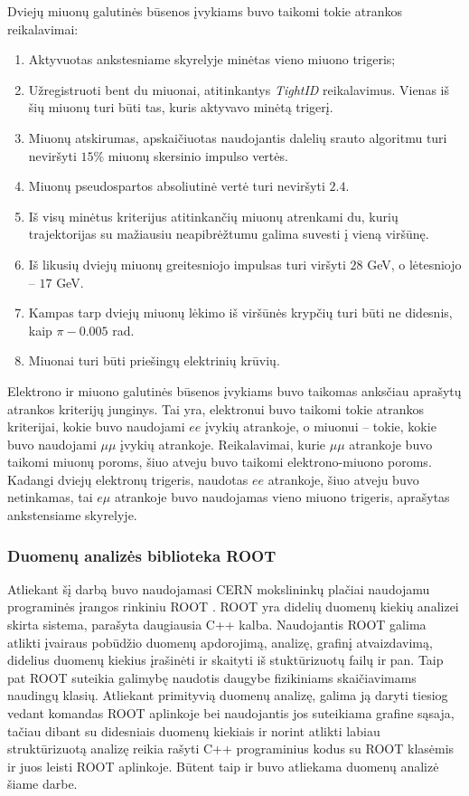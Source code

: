 \documentclass[a4paper, 12pt]{article}
\newcommand{\emu}{e\mu}
\newcommand{\mumu}{\mu\mu}
\begin{document}
Dviejų miuonų galutinės būsenos įvykiams buvo taikomi tokie atrankos reikalavimai:
\begin{enumerate}
	\item Aktyvuotas ankstesniame skyrelyje minėtas vieno miuono trigeris;
	\item Užregistruoti bent du miuonai, atitinkantys \textit{TightID} reikalavimus. Vienas iš šių miuonų turi būti
	tas, kuris aktyvavo	minėtą trigerį.
	\item Miuonų atskirumas, apskaičiuotas naudojantis dalelių srauto algoritmu turi neviršyti $15\%$ miuonų skersinio
	impulso vertės.
	\item Miuonų pseudospartos absoliutinė vertė turi neviršyti $2.4$.
	\item Iš visų minėtus kriterijus atitinkančių miuonų atrenkami du, kurių trajektorijas su mažiausiu neapibrėžtumu
	galima suvesti į vieną viršūnę.
	\item Iš likusių dviejų miuonų greitesniojo impulsas turi viršyti $28$ GeV, o lėtesniojo -- $17$ GeV.
	\item Kampas tarp dviejų miuonų lėkimo iš viršūnės krypčių turi būti ne didesnis, kaip $\pi - 0.005$ rad.
	\item Miuonai turi būti priešingų elektrinių krūvių.
\end{enumerate}

Elektrono ir miuono galutinės būsenos įvykiams buvo taikomas anksčiau aprašytų atrankos kriterijų junginys.
Tai yra, elektronui buvo taikomi tokie atrankos kriterijai, kokie buvo naudojami $ee$ įvykių atrankoje, o miuonui --
tokie, kokie buvo naudojami $\mumu$ įvykių atrankoje. Reikalavimai, kurie $\mumu$ atrankoje buvo taikomi miuonų poroms,
šiuo atveju buvo taikomi elektrono-miuono poroms.
Kadangi dviejų elektronų trigeris, naudotas $ee$ atrankoje, šiuo atveju buvo netinkamas, tai $\emu$ atrankoje buvo naudojamas
vieno miuono trigeris, aprašytas ankstensiame skyrelyje.

\subsubsection{Duomenų analizės biblioteka ROOT}

Atliekant šį darbą buvo naudojamasi CERN mokslininkų plačiai naudojamu programinės įrangos rinkiniu ROOT \cite{ROOT}.
ROOT yra didelių duomenų kiekių analizei skirta sistema, parašyta daugiausia C++ kalba.
Naudojantis ROOT galima atlikti įvairaus pobūdžio duomenų apdorojimą, analizę, grafinį atvaizdavimą, didelius duomenų
kiekius įrašinėti ir skaityti iš stuktūrizuotų failų ir pan.
Taip pat ROOT suteikia galimybę naudotis daugybe fizikiniams skaičiavimams naudingų klasių.
Atliekant primityvią duomenų analizę, galima ją daryti tiesiog vedant komandas ROOT aplinkoje bei naudojantis jos
suteikiama grafine sąsaja, tačiau dibant su didesniais duomenų kiekiais ir norint atlikti labiau struktūrizuotą analizę
reikia rašyti C++ programinius kodus su ROOT klasėmis ir juos leisti ROOT aplinkoje.
Būtent taip ir buvo atliekama duomenų analizė šiame darbe.
\end{document}
